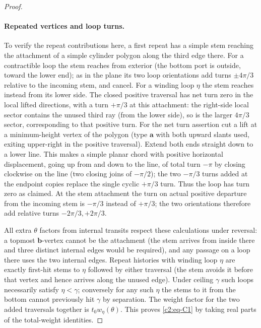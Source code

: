 \begin{proof}
\paragraph{Repeated vertices and loop turns.}
To verify the repeat contributions here, a first repeat has a simple stem reaching the attachment of a simple cylinder polygon along the third edge there. For a contractible loop the stem reaches from exterior (the bottom port is outside, toward the lower end); as in the plane its two loop orientations add turns \(\pm4\pi/3\) relative to the incoming stem, and cancel. For a winding loop \(\eta\) the stem reaches instead from its lower side. The closed positive traversal has net turn zero in the local lifted directions, with a turn \(+\pi/3\) at this attachment: the right-side local sector contains the unused third ray (from the lower side), so is the larger \(4\pi/3\) sector, corresponding to that positive turn. For the net turn assertion cut a lift at a minimum-height vertex of the polygon (type \(\mathbf a\) with both upward slants used, exiting upper-right in the positive traversal). Extend both ends straight down to a lower line. This makes a simple planar chord with positive horizontal displacement, going up from and down to the line, of total turn \(-\pi\) by closing clockwise on the line (two closing joins of \(-\pi/2\)); the two \(-\pi/3\) turns added at the endpoint copies replace the single cyclic \(+\pi/3\) turn. Thus the loop has turn zero as claimed. At the stem attachment the turn on actual positive departure from the incoming stem is \(-\pi/3\) instead of \(+\pi/3\); the two orientations therefore add relative turns \(-2\pi/3,+2\pi/3\).

All extra \(\theta\) factors from internal transits respect these calculations under reversal: a topmost \(\mathbf b\)-vertex cannot be the attachment (the stem arrives from inside there and three distinct internal edges would be required), and any passage on a loop there uses the two internal edges. Repeat histories with winding loop \(\eta\) are exactly first-hit stems to \(\eta\) followed by either traversal (the stem avoids it before that vertex and hence arrives along the unused edge). Under ceiling \(\gamma\) such loops necessarily satisfy \(\eta<\gamma\); conversely for any such \(\eta\) the stems to it from the bottom cannot previously hit \(\gamma\) by separation. The weight factor for the two added traversals together is \(t_0 w_\eta(\theta)\). This proves \eqref{c2:eq-C1} by taking real parts of the total-weight identities.


\end{proof}
